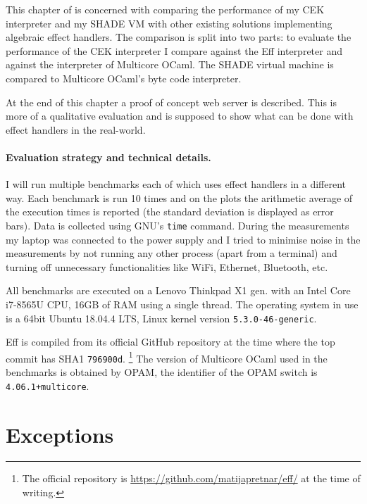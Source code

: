 \documentclass[class=article, crop=false]{standalone}
\begin{document}

This chapter of is concerned with comparing the performance of my CEK interpreter
and my SHADE VM with other existing solutions implementing algebraic effect handlers.
The comparison is split into two parts: to evaluate the performance of the
CEK interpreter I compare against the Eff interpreter and against the interpreter
of Multicore OCaml. The SHADE virtual machine is compared to Multicore OCaml's
byte code interpreter.

At the end of this chapter a proof of concept web server is described. This is
more of a qualitative evaluation and is supposed to show what can be done 
with effect handlers in the real-world.

\paragraph{Evaluation strategy and technical details.}

I will run multiple benchmarks each of which uses effect handlers in a different
way. Each benchmark is run 10 times and on the plots the arithmetic average of
the execution times is reported (the standard deviation is displayed as error
bars). Data is collected using GNU's \verb|time| command. During the measurements
my laptop was connected to the power supply and I tried to minimise noise in the measurements
by not running any other process (apart from a terminal) and turning off
unnecessary functionalities like WiFi, Ethernet, Bluetooth, etc.

All benchmarks are executed on a Lenovo Thinkpad X1  gen. with an Intel
Core i7-8565U CPU, 16GB of RAM using a single thread. The operating system in
use is a 64bit Ubuntu 18.04.4 LTS, Linux kernel version \verb|5.3.0-46-generic|.

Eff is compiled from its official GitHub repository at the time where the top
commit has SHA1 \verb|796900d|.
\footnote{The official repository is
\url{https://github.com/matijapretnar/eff/} at the time of writing.}
The version of Multicore OCaml used in the benchmarks is obtained by OPAM, the
identifier of the OPAM switch is \verb|4.06.1+multicore|.

\section{Exceptions}
\end{document}
